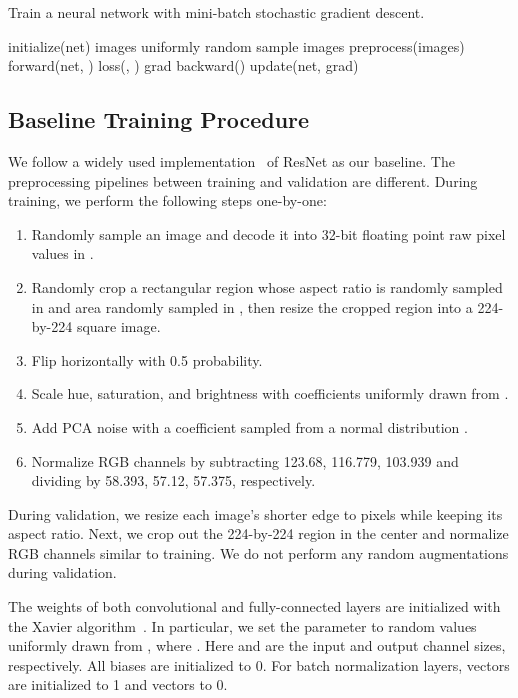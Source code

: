 \documentclass[10pt,twocolumn,letterpaper]{article}
\begin{document}
\begin{algorithm}[t!]
\caption{Train a neural network with mini-batch stochastic gradient descent.}
\label{algo:sgd}
\begin{algorithmic}
\State initialize(net)
\For{}
\For{}
\State images  uniformly random sample  images
\State  preprocess(images)
\State  forward(net, )
\State  loss(, )
\State grad  backward()
\State update(net, grad)
\EndFor
\EndFor
\end{algorithmic}
\end{algorithm}

\subsection{Baseline Training Procedure}
\label{sec:basel-train-proc}

We follow a widely used implementation~\cite{resnet_torch} of ResNet as our baseline.
The preprocessing pipelines between training and validation are different. During training, we perform the following steps one-by-one:
\begin{enumerate}
\item Randomly sample an image and decode it into 32-bit floating point raw pixel values in . 
\item Randomly crop a rectangular region whose aspect ratio is randomly sampled
  in  and area randomly sampled in  , then resize the cropped region into a 224-by-224 square image.
\item Flip horizontally with 0.5 probability.
\item Scale hue, saturation, and brightness with coefficients uniformly drawn from .
\item Add PCA noise with a coefficient sampled from a normal distribution .
\item Normalize RGB channels by subtracting
123.68, 116.779, 103.939 and dividing by 58.393, 57.12, 57.375,
respectively.
\end{enumerate}

During validation, we resize each image's shorter edge to  pixels
while keeping its aspect ratio. Next, we crop out the 224-by-224 region in the
center and normalize RGB channels similar to training.
We do not perform any random augmentations during validation.

The weights of both convolutional and fully-connected layers are initialized with the
Xavier algorithm~\cite{glorot2010understanding}. In particular,
we set the parameter to random values uniformly drawn from ,
where . Here  and   are the input and output channel sizes,
respectively. All biases are initialized to 0.
For batch normalization layers,  vectors are initialized to 1 and  vectors to 0.
\end{document}
